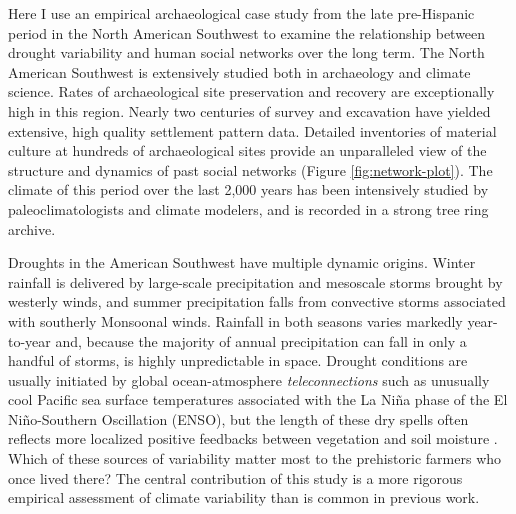 \documentclass[10pt]{iopart}
\begin{document}
Here I use an empirical archaeological case study from the late pre-Hispanic period in the North American Southwest to examine the relationship between drought variability and human social networks over the long term. The North American Southwest is extensively studied both in archaeology and climate science. Rates of archaeological site preservation and recovery are exceptionally high in this region. Nearly two centuries of survey and excavation have yielded extensive, high quality settlement pattern data. Detailed inventories of material culture at hundreds of archaeological sites provide an unparalleled view of the structure and dynamics of past social networks (Figure \ref{fig:network-plot}). The climate of this period over the last 2,000 years has been intensively studied by paleoclimatologists and climate modelers, and is recorded in a strong tree ring archive.

Droughts in the American Southwest have multiple dynamic origins. Winter rainfall is delivered by large-scale precipitation and mesoscale storms brought by westerly winds, and summer precipitation falls from convective storms associated with southerly Monsoonal winds. Rainfall in both seasons varies markedly year-to-year and, because the majority of annual precipitation can fall in only a handful of storms, is highly unpredictable in space. Drought conditions are usually initiated by global ocean-atmosphere \textit{teleconnections} such as unusually cool Pacific sea surface temperatures associated with the La Ni\~{n}a phase of the El Ni\~{n}o-Southern Oscillation (ENSO), but the length of these dry spells often reflects more localized positive feedbacks between vegetation and soil moisture \parencite{Koster2004RegionsPrecipitation,Ault2014AssessingData}. Which of these sources of variability matter most to the prehistoric farmers who once lived there? The central contribution of this study is a more rigorous empirical assessment of climate variability than is common in previous work.
\end{document}
